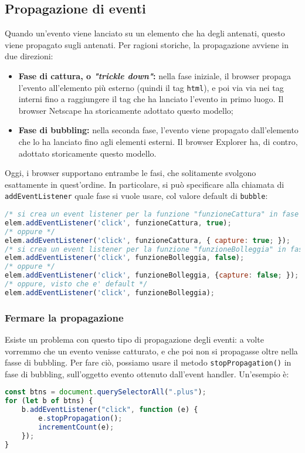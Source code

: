 \documentclass[a4paper,11pt]{article}
\begin{document}
\subsection{Propagazione di eventi}
Quando un'evento viene lanciato su un elemento che ha degli antenati, questo viene propagato sugli antenati.
Per ragioni storiche, la propagazione avviene in due direzioni:
\begin{itemize}
	\item \textbf{Fase di cattura, o \textit{"trickle down"}:} nella fase iniziale, il browser propaga l'evento all'elemento più esterno (quindi il tag \lstinline|html|), e poi via via nei tag interni fino a raggiungere il tag che ha lanciato l'evento in primo luogo. Il browser Netscape ha storicamente adottato questo modello;
	\item \textbf{Fase di bubbling:} nella seconda fase, l'evento viene propagato dall'elemento che lo ha lanciato fino agli elementi esterni. Il browser Explorer ha, di contro, adottato storicamente questo modello.
\end{itemize}

Oggi, i browser supportano entrambe le fasi, che solitamente svolgono esattamente in quest'ordine.
In particolare, si può specificare alla chiamata di \lstinline|addEventListener| quale fase si vuole usare, col valore default di \lstinline|bubble|:
\begin{lstlisting}[language=javascript, style=codestyle]	
/* si crea un event listener per la funzione "funzioneCattura" in fase di cattura */
elem.addEventListener('click', funzioneCattura, true);
/* oppure */
elem.addEventListener('click', funzioneCattura, { capture: true; });
/* si crea un event listener per la funzione "funzioneBolleggia" in fase di bubbling */
elem.addEventListener('click', funzioneBolleggia, false);
/* oppure */
elem.addEventListener('click', funzioneBolleggia, {capture: false; });
/* oppure, visto che e' default */
elem.addEventListener('click', funzioneBolleggia);
\end{lstlisting}

\subsubsection{Fermare la propagazione}

Esiste un problema con questo tipo di propagazione degli eventi: a volte vorremmo che un evento venisse catturato, e che poi non si propagasse oltre nella fasse di bubbling. 
Per fare ciò, possiamo usare il metodo \lstinline|stopPropagation()| in fase di bubbling, sull'oggetto evento ottenuto dall'event handler. Un'esempio è:
\begin{lstlisting}[language=javascript, style=codestyle]	
const btns = document.querySelectorAll(".plus");
for (let b of btns) {
	b.addEventListener("click", function (e) {
		e.stopPropagation();
		incrementCount(e);
	});
}
\end{lstlisting}
\end{document}
